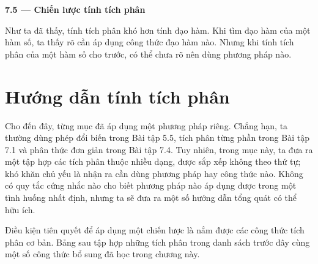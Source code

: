 \documentclass[12pt,a4paper]{article}
\begin{document}
\begin{center}{\Large\bfseries 7.5 — Chiến lược tính tích phân}\end{center}
Như ta đã thấy, tính tích phân khó hơn tính đạo hàm. Khi tìm đạo hàm của một hàm số, ta thấy rõ cần áp dụng công thức đạo hàm nào. Nhưng khi tính tích phân của một hàm số cho trước, có thể chưa rõ nên dùng phương pháp nào.

\section*{Hướng dẫn tính tích phân}
Cho đến đây, từng mục đã áp dụng một phương pháp riêng. Chẳng hạn, ta thường dùng phép đổi biến trong Bài tập 5.5, tích phân từng phần trong Bài tập 7.1 và phân thức đơn giản trong Bài tập 7.4. Tuy nhiên, trong mục này, ta đưa ra một tập hợp các tích phân thuộc nhiều dạng, được sắp xếp không theo thứ tự; khó khăn chủ yếu là nhận ra cần dùng phương pháp hay công thức nào. Không có quy tắc cứng nhắc nào cho biết phương pháp nào áp dụng được trong một tình huống nhất định, nhưng ta sẽ đưa ra một số hướng dẫn tổng quát có thể hữu ích.

Điều kiện tiên quyết để áp dụng một chiến lược là nắm được các công thức tích phân cơ bản. Bảng sau tập hợp những tích phân trong danh sách trước đây cùng một số công thức bổ sung đã học trong chương này.
\end{document}
